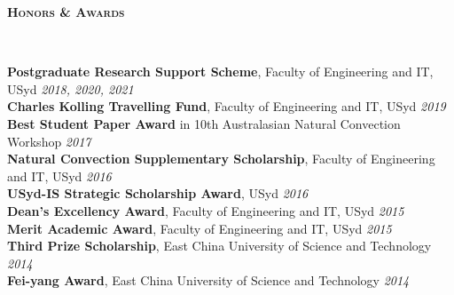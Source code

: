 \documentclass[letterpaper, 10pt]{article}
\newenvironment{changemargin}[2]{%
  \begin{list}{}{%
      \setlength{\topsep}{0pt}%
      \setlength{\leftmargin}{#1}%
      \setlength{\rightmargin}{#2}%
      \setlength{\listparindent}{\parindent}%
      \setlength{\itemindent}{\parindent}%
      \setlength{\parsep}{\parskip}%
    }%
  \item[]}{\end{list}
}
\newcommand{\lineover}{
  \begin{changemargin}{-0.05in}{-0.05in}
    \vspace*{-8pt}
    \hrulefill \\
    \vspace*{-2pt}
  \end{changemargin}
}
\newcommand{\header}[1]{
  \begin{changemargin}{-0.5in}{-0.5in}
    \textbf{\scshape{#1}}\\
    \lineover
  \end{changemargin}
}
\newenvironment{body} {
  \vspace*{-16pt}
  \begin{changemargin}{-0.25in}{-0.5in}
  }
  {\end{changemargin}
}
\begin{document}
\header{Honors \& Awards}
\begin{body}
	\vspace{14pt}
	\textbf{Postgraduate Research Support Scheme}, Faculty of Engineering and IT, USyd\hfill
	\emph{2018, 2020, 2021}\\ \smallskip
	\textbf{Charles Kolling Travelling Fund}, Faculty of Engineering and IT, USyd\hfill
	\emph{2019}\\ \smallskip
	\textbf{Best Student Paper Award}
	in 10th Australasian Natural Convection Workshop
	\hfill \emph{2017}\\ \smallskip
	\textbf{Natural Convection Supplementary Scholarship}, Faculty of Engineering and IT, USyd \hfill
	\emph{2016}\\ \smallskip
	\textbf{USyd-IS Strategic Scholarship Award}, 
	USyd \hfill \emph{2016}\\
	\smallskip
	\textbf{Dean's Excellency Award}, Faculty of Engineering and IT, USyd \hfill \emph{2015}\\
	\textbf{Merit Academic Award}, Faculty of Engineering and IT, USyd \hfill \emph{2015}\\
	\textbf{Third Prize Scholarship}, East China University of Science and Technology \hfill \emph{2014}\\
	\textbf{Fei-yang Award}, East China University of Science and Technology \hfill \emph{2014}\\
	
	
\end{body}
\smallskip
%	
%	
%	
\end{document}
